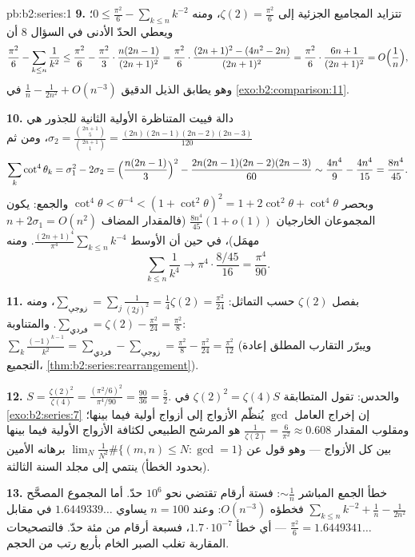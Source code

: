 \begin{solution}{pb:b2:series:1}
\textbf{9.} تتزايد المجاميع الجزئية إلى $\zeta(2) =
\frac{\pi^2}6$، ومنه $0 \leq \frac{\pi^2}6 - \sum_{k\leq n}k^{-2}$؛
ويعطي الحدّ الأدنى في السؤال 8 أن
\[
\frac{\pi^2}6 - \sum_{k\leq n}\frac1{k^2}
\leq \frac{\pi^2}6 - \frac{\pi^2}3\cdot\frac{n(2n-1)}{(2n+1)^2}
= \frac{\pi^2}6\cdot\frac{(2n+1)^2 - (4n^2 -
2n)}{(2n+1)^2}
= \frac{\pi^2}6\cdot\frac{6n + 1}{(2n+1)^2}
= O\Bigl(\frac1n\Bigr),
\]
وهو يطابق الذيل الدقيق $\frac1n - \frac1{2n^2} + O(n^{-3})$ في
\cref{exo:b2:comparison:11}.

\textbf{10.} دالة فييت المتناظرة الأولية الثانية
للجذور هي $\sigma_2 = \frac{\binom{2n+1}5}{\binom{2n+1}1} =
\frac{(2n)(2n-1)(2n-2)(2n-3)}{120}$، ومن ثم
\[
\sum_k\cot^4\theta_k = \sigma_1^2 - 2\sigma_2
= \Bigl(\frac{n(2n-1)}3\Bigr)^2 -
\frac{2n(2n-1)(2n-2)(2n-3)}{60}
\sim \frac{4n^4}9 - \frac{4n^4}{15} = \frac{8n^4}{45}.
\]
وبحصر $\cot^4\theta < \theta^{-4} < (1 + \cot^2\theta)^2 =
1 + 2\cot^2\theta + \cot^4\theta$ والجمع: يكون المجموعان الخارجيان
$\frac{8n^4}{45}(1 + o(1))$ (فالمقدار المضاف $n + 2\sigma_1 =
O(n^2)$ مهمَل)، في حين أن الأوسط
$\frac{(2n+1)^4}{\pi^4}\sum_{k\leq n}k^{-4}$. ومنه
\[
\sum_{k\leq n}\frac1{k^4} \longrightarrow
\pi^4\cdot\frac{8/45}{16} = \frac{\pi^4}{90}.
\]

\textbf{11.} بفصل $\zeta(2)$ حسب التماثل: $\sum_{\text{زوجي}}
= \sum_j\frac{1}{(2j)^2} = \frac14\zeta(2) = \frac{\pi^2}{24}$،
ومنه $\sum_{\text{فردي}} = \zeta(2) - \frac{\pi^2}{24} =
\frac{\pi^2}8$. والمتناوبة: $\sum_k\frac{(-1)^{k-1}}{k^2} =
\sum_{\text{فردي}} - \sum_{\text{زوجي}} = \frac{\pi^2}8 -
\frac{\pi^2}{24} = \frac{\pi^2}{12}$ (ويبرّر التقارب المطلق
إعادة التجميع،
\cref{thm:b2:series:rearrangement}).

\textbf{12.} $S = \frac{\zeta(2)^2}{\zeta(4)} =
\frac{(\pi^2/6)^2}{\pi^4/90} = \frac{90}{36} = \frac52$.
والحدس: تقول المتطابقة $\zeta(2)^2 = \zeta(4)S$ في
\cref{exo:b2:series:7} إن إخراج العامل $\gcd$
يُنظّم الأزواج إلى أزواج أولية فيما بينها؛ ومقلوب المقدار
$\frac1{\zeta(2)} = \frac6{\pi^2} \approx 0.608$ هو المرشح الطبيعي
لكثافة الأزواج الأولية فيما بينها بين كل الأزواج ---
وهو قول عن $\lim_N \frac{1}{N^2}\#\{(m,n) \leq N :
\gcd = 1\}$ برهانه الأمين (بحدود الخطأ) ينتمي إلى
مجلد السنة الثالثة.

\textbf{13.} خطأ الجمع المباشر $\sim \frac1n$: فستة
أرقام تقتضي نحو $10^6$ حدّ. أما المجموع المصحَّح
$\sum_{k\leq n}k^{-2} + \frac1n - \frac1{2n^2}$ فخطؤه
$O(n^{-3})$: وعند $n = 100$ يساوي $1.6449339\dots$ في مقابل
$\frac{\pi^2}6 = 1.6449341\dots$ --- أي خطأ $1.7\cdot10^{-7}$،
فسبعة أرقام من مئة حدّ. فالتصحيحات المقاربة تغلب
الصبر الخام بأربع رتب من الحجم.


\end{solution}
